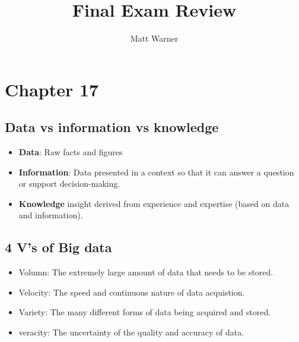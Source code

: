 \documentclass{report}
\title{\Huge{Final Exam Review}}
\author{\huge{Matt Warner}}
\date{\huge{}}
\begin{document}
    \maketitle
\section{Chapter 17}
\subsection{Data vs information vs knowledge}
\begin{itemize}
    \item \textbf{Data}: Raw facts and figures
    \item \textbf{Information}: Data presented in a context so that it can answer a question or support decision-making.
\item \textbf{Knowledge} insight derived from experience and expertise (based on data and information).
\end{itemize}
\subsection{4 V's of Big data}
\begin{itemize}
    \item Volumn: The extremely large amount of data that needs to be stored.
    \item Velocity: The speed and continuous nature of data acquistion.
    \item Variety: The many different forms of data being acquired and stored.
    \item veracity: The uncertainty of the quality and accuracy of data.
\end{itemize}
\end{document}
